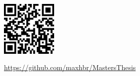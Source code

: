 \newpage\thispagestyle{empty}
\mbox{}\vfill
\begin{center}
  \includegraphics[width=0.2\textwidth]{qrCode.eps}
\end{center}
\begin{center}
  \url{https://github.com/maxhbr/MastersThesis}
\end{center}

